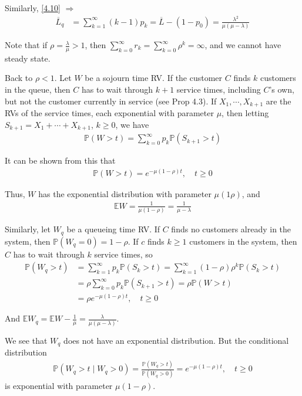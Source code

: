 Similarly, \ref{4.10} $\Rightarrow$
\begin{align*}
    \overline{L}_q &= \sum\limits_{k=1}^{\infty} (k-1)p_k = \overline{L} - (1-p_0) = \frac{\lambda^2}{\mu(\mu - \lambda)}
\end{align*}

Note that if $\rho = \frac{\lambda}{\mu} > 1$, then $\sum\limits_{k=0}^{\infty} r_k = \sum\limits_{k=0}^{\infty} \rho^k = \infty$, and we cannot have steady state.

Back to $\rho<1$. Let $W$ be a sojourn time RV. If the customer $C$ finds $k$ customers in the queue, then $C$ has to wait through $k + 1$ service times, including $C$'s own, but not the customer currently in service (see Prop 4.3). If $X_1,\cdots, X_{k+1}$ are the RVs of the service times, each exponential with parameter $\mu$, then letting $S_{k+1} = X_1 + \cdots + X_{k+1}$, $k\geqslant 0$, we have
\begin{align*}
    \mathbb{P}(W>t) = \sum\limits_{k=0}^{\infty} p_k \mathbb{P}(S_{k+1}>t)
\end{align*}

It can be shown from this that 
\begin{align*}
    \mathbb{P}(W>t) = e^{-\mu(1-\rho)t},\quad t\geqslant 0
\end{align*}

Thus, $W$ has the exponential distribution with parameter $\mu(1\rho)$, and 
\begin{align*}
    \mathbb{E} W = \frac{1}{\mu(1-\rho)} = \frac{1}{\mu - \lambda}
\end{align*}

Similarly, let $W_q$ be a queueing time RV. If $C$ finds no customers already in the system, then $\mathbb{P}(W_q = 0) = 1-\rho$. If $c$ finds $k\geqslant 1$ customers in the system, then $C$ has to wait through $k$ service times, so 
\begin{align*}
    \mathbb{P}(W_q > t) &= \sum\limits_{k=1}^{\infty} p_k \mathbb{P}(S_k>t) = \sum\limits_{k=1}^{\infty} (1-\rho)\rho^k \mathbb{P}(S_k>t) \\
    &= \rho\sum\limits_{k=0}^{\infty} p_k \mathbb{P}(S_{k+1}>t) = \rho\mathbb{P}(W>t) \\
    & = \rho e^{-\mu(1-\rho)t},\quad t\geqslant 0
\end{align*}

And $\mathbb{E} W_q = \mathbb{E} W - \frac{1}{\mu} = \frac{\lambda}{\mu(\mu - \lambda)}$.

We see that $W_q$ does not have an exponential distribution. But the conditional distribution 
\begin{align*}
    \mathbb{P}(W_q>t\mid W_q>0) = \frac{\mathbb{P}(W_q>t)}{\mathbb{P}(W_q>0)} = e^{-\mu(1-\rho)t},\quad t\geqslant 0
\end{align*}
is exponential with parameter $\mu(1-\rho)$.

